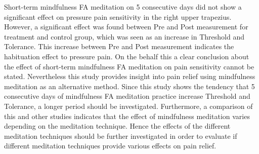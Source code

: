 Short-term mindfulness FA meditation on 5 consecutive days did not show a significant effect on pressure pain sensitivity in the right upper trapezius. However, a significant effect was found between Pre and Post measurement for treatment and control group, which was seen as an increase in Threshold and Tolerance. This increase between Pre and Post measurement indicates the habituation effect to pressure pain.
On the behalf this a clear conclusion about the effect of short-term mindfulness FA meditation on pain sensitivity cannot be stated. Nevertheless this study provides insight into pain relief using mindfulness meditation as an alternative method.
Since this study shows the tendency that 5 consecutive days of mindfulness FA meditation practice increase Threshold and Tolerance, a longer period should be investigated. 
Furthermore, a comparison of this and
other studies indicates that the effect of mindfulness meditation varies depending on the
meditation technique. Hence the effects of the different meditation techniques should be
further investigated in order to evaluate if different meditation techniques provide various
effects on pain relief.


